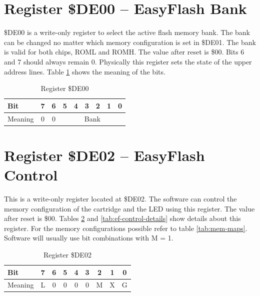 \documentclass[a4paper,oneside]{memoir}
\begin{document}
\section{Register \$DE00 – EasyFlash Bank}

\$DE00 is a write-only register to select the active flash memory bank. The bank can be changed no matter which memory configuration is set in \$DE01. The bank is valid for both chips, ROML and ROMH. The value after reset is \$00. Bits 6 and 7 should always remain 0. Physically this register sets the state of the upper address lines. Table \ref{tab:ef-bank} shows the meaning of the bits.

\begin{table}[!htbp]
    \centering
    \begin{tabularx}{0.6\textwidth}{X|c|c|c|c|c|c|c|c}
        \toprule
        Bit     & 7 & 6 & 5 & 4 & 3 & 2 & 1 & 0 \\
        \midrule
        Meaning & 0 & 0 & \multicolumn{6}{c}{Bank} \\
        \bottomrule
    \end{tabularx}
    \caption{Register \$DE00}
    \label{tab:ef-bank}
\end{table}

\section{Register \$DE02 – EasyFlash Control}

This is a write-only register located at \$DE02. The software can control the memory configuration of the cartridge and the LED using this register. The value after reset is \$00. Tables \ref{tab:ef-control} and \ref{tab:ef-control-details} show details about this register. For the memory configurations possible refer to table \ref{tab:mem-maps}. Software will usually use bit combinations with M = 1.

\begin{table}
    \centering
    \begin{tabularx}{0.6\textwidth}{X|c|c|c|c|c|c|c|c}
        \toprule
        Bit     & 7 & 6 & 5 & 4 & 3 & 2 & 1 & 0 \\
        \midrule
        Meaning & L & 0 & 0 & 0 & 0 & M & X & G \\
        \bottomrule
    \end{tabularx}
    \caption{Register \$DE02}
    \label{tab:ef-control}
\end{table}
\end{document}
